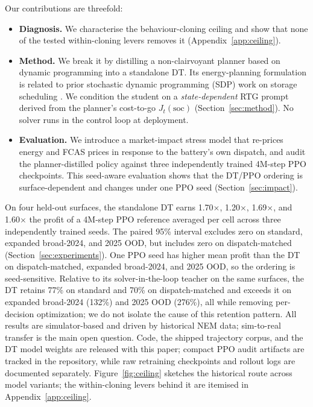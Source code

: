 \documentclass{article}
\begin{document}
Our contributions are threefold:

\begin{itemize}
  \item \textbf{Diagnosis.} We characterise the behaviour-cloning ceiling and
  show that none of the tested within-cloning levers removes it
  (Appendix~\ref{app:ceiling}).
  \item \textbf{Method.} We break it by distilling a non-clairvoyant planner
  based on dynamic programming into a standalone DT.
  Its energy-planning formulation is related to prior stochastic dynamic
  programming (SDP) work on storage scheduling \citep{abdulla2016optimal}. We
  condition the student on a \emph{state-dependent} RTG prompt derived from the
  planner's cost-to-go $J_t(\mathrm{soc})$ (Section~\ref{sec:method}). No solver
  runs in the control loop at deployment.
  \item \textbf{Evaluation.} We introduce a market-impact stress model that
  re-prices energy and FCAS prices in response to the battery's own dispatch,
  and audit the planner-distilled policy against three independently trained
  4M-step PPO checkpoints. This seed-aware evaluation shows that the DT/PPO
  ordering is surface-dependent and changes under one PPO seed
  (Section~\ref{sec:impact}).
\end{itemize}

On four held-out surfaces, the standalone DT earns 1.70$\times$, 1.20$\times$,
1.69$\times$, and 1.60$\times$ the profit of a 4M-step PPO reference averaged
per cell across three independently trained seeds. The paired 95\% interval
excludes zero on standard, expanded broad-2024, and 2025 OOD, but includes zero
on dispatch-matched (Section~\ref{sec:experiments}). One PPO seed has higher mean
profit than the DT on dispatch-matched, expanded broad-2024, and 2025 OOD, so the
ordering is seed-sensitive. Relative to its solver-in-the-loop teacher on the
same surfaces, the DT retains 77\% on standard and 70\% on dispatch-matched and
exceeds it on expanded broad-2024 (132\%) and 2025 OOD (276\%), all while removing
per-decision optimization; we do not isolate the cause of this retention pattern.
All
results are simulator-based and driven by historical NEM data; sim-to-real
transfer is the main open question. Code, the shipped trajectory corpus, and
the DT model weights are released with this paper; compact PPO audit artifacts
are tracked in the repository, while raw retraining checkpoints and rollout
logs are documented separately. Figure~\ref{fig:ceiling} sketches the historical
route across model variants; the within-cloning levers behind it are itemised in
Appendix~\ref{app:ceiling}.
\end{document}
